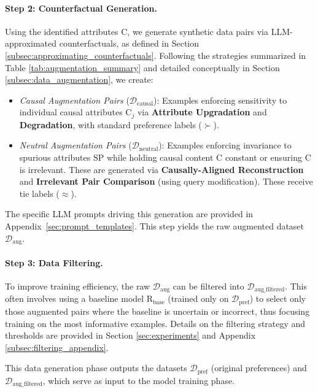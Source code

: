 \paragraph{Step 2: Counterfactual Generation.}
Using the identified attributes $\mathrm{C}$, we generate synthetic data pairs via LLM-approximated counterfactuals, as defined in Section \ref{subsec:approximating_counterfactuals}. Following the strategies summarized in Table \ref{tab:augmentation_summary} and detailed conceptually in Section \ref{subsec:data_augmentation}, we create:
\begin{itemize}[itemsep=0pt, left=10pt]
    \item \textit{Causal Augmentation Pairs} ($\mathcal{D}_{\mathrm{causal}}$): Examples enforcing sensitivity to individual causal attributes $\mathrm{C}_j$ via \textbf{Attribute Upgradation} and \textbf{Degradation}, with  standard preference labels ($\succ$).
    \item \textit{Neutral Augmentation Pairs} ($\mathcal{D}_{\mathrm{neutral}}$): Examples enforcing invariance to spurious attributes $\mathrm{SP}$ while holding causal content $\mathrm{C}$ constant or ensuring $\mathrm{C}$ is irrelevant. These are generated via \textbf{Causally-Aligned Reconstruction} and \textbf{Irrelevant Pair Comparison} (using query modification). These receive tie labels ($\approx$).
\end{itemize}
The specific LLM prompts driving this generation are provided in Appendix~\ref{sec:prompt_templates}. This step yields the raw augmented dataset $\mathcal{D}_{\mathrm{aug}}$.

\paragraph{Step 3: Data Filtering.}
To improve training efficiency, the raw $\mathcal{D}_{\mathrm{aug}}$ can be filtered into $\mathcal{D}_{\mathrm{aug\_filtered}}$. This often involves using a baseline model $\hat{\mathrm{R}}_{\mathrm{base}}$ (trained only on $\mathcal{D}_{\mathrm{pref}}$) to select only those augmented pairs where the baseline is uncertain or incorrect, thus focusing training on the most informative examples. Details on the filtering strategy and thresholds are provided in Section \ref{sec:experiments} and Appendix \ref{subsec:filtering_appendix}.

This data generation phase outputs the datasets $\mathcal{D}_{\mathrm{pref}}$ (original preferences) and $\mathcal{D}_{\mathrm{aug\_filtered}}$, which serve as input to the model training phase.

